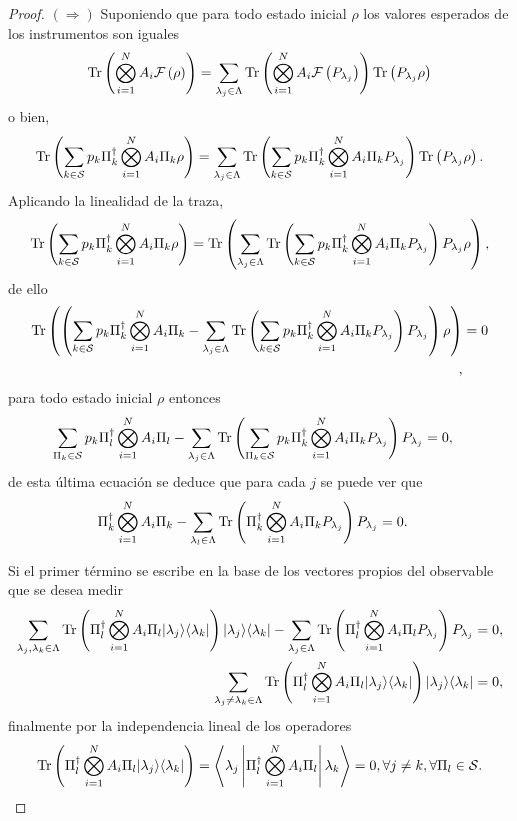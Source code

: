 \documentclass[12pt,oneside]{book}\raggedbottom{}
\begin{document}
\begin{proof}
    $(\Rightarrow)$ Suponiendo que para todo estado inicial $\rho$ los valores esperados de los instrumentos son iguales \[ {\rm Tr}\left( \bigotimes_{i=1}^{N} A_i \mathcal{F}\left(\rho\right)\right)=\sum_{\lambda_j\in \Lambda} {\rm Tr}\left(\bigotimes_{i=1}^{N} A_i\mathcal{F}\left(P_{\lambda_j}\right)\right) {\rm Tr}\left(P_{\lambda_j}\rho\right)\]
o bien, \[ {\rm Tr}\left( \sum_{k\in \mathcal{S}}p_k\Pi_{k}^{\dagger}\bigotimes_{i=1}^{N} A_i \Pi_{k}\rho\right)=\sum_{\lambda_j\in \Lambda} {\rm Tr}\left(\sum_{k\in \mathcal{S}}p_k\Pi_{k}^{\dagger}\bigotimes_{i=1}^{N} A_i\Pi_{k}P_{\lambda_j}\right) {\rm Tr}\left(P_{\lambda_j}\rho\right).\] Aplicando la linealidad de la traza, \[ {\rm Tr}\left( \sum_{k\in \mathcal{S}}p_k\Pi_{k}^{\dagger}\bigotimes_{i=1}^{N} A_i \Pi_{k}\rho\right)={\rm Tr}\left(\sum_{\lambda_j\in \Lambda} {\rm Tr}\left(\sum_{k\in \mathcal{S}}p_k\Pi_{k}^{\dagger}\bigotimes_{i=1}^{N} A_i\Pi_{k}P_{\lambda_j}\right) P_{\lambda_j}\rho\right),\]de ello  \[ \begin{split}{\rm Tr}\left( \left(\sum_{k\in \mathcal{S}}p_k\Pi_{k}^{\dagger}\bigotimes_{i=1}^{N} A_i \Pi_{k}-\sum_{\lambda_j\in \Lambda} {\rm Tr}\left(\sum_{k\in \mathcal{S}}p_k\Pi_{k}^{\dagger}\bigotimes_{i=1}^{N} A_i\Pi_{k}P_{\lambda_j}\right) P_{\lambda_j}\right)\rho\right)&=0\\,\end{split}\] para todo estado inicial $\rho$ entonces\[\begin{split}
    \sum_{\Pi_k\in \mathcal{S}}p_k\Pi_{l}^{\dagger}\bigotimes_{i=1}^{N} A_i \Pi_{l}-\sum_{\lambda_j\in \Lambda} {\rm Tr}\left(\sum_{\Pi_k\in \mathcal{S}}p_k\Pi_{k}^{\dagger}\bigotimes_{i=1}^{N} A_i\Pi_{k}P_{\lambda_j}\right) P_{\lambda_j}&=0, 
\end{split}\] de esta última ecuación se deduce que para cada $j$ se puede ver que \[\begin{split}
    \Pi_{k}^{\dagger}\bigotimes_{i=1}^{N} A_i \Pi_{k}-\sum_{\lambda_l\in \Lambda} {\rm Tr}\left(\Pi_{k}^{\dagger}\bigotimes_{i=1}^{N} A_i\Pi_{k}P_{\lambda_j}\right) P_{\lambda_j}&=0.
\end{split}\] 

Si el primer término se escribe en la base de los vectores propios del observable que se desea medir  \[\begin{split}
    \sum_{\lambda_j, \lambda_k\in \Lambda} {\rm Tr}\left(\Pi_{l}^{\dagger}\bigotimes_{i=1}^{N} A_i\Pi_{l}|\lambda_j\rangle \langle \lambda_k|\right) |\lambda_j\rangle \langle\lambda_k|-\sum_{\lambda_j\in \Lambda} {\rm Tr}\left(\Pi_{l}^{\dagger}\bigotimes_{i=1}^{N} A_i\Pi_{l}P_{\lambda_j}\right) P_{\lambda_j}&=0,\\
    \sum_{\lambda_j\neq\lambda_k\in \Lambda} {\rm Tr}\left(\Pi_{l}^{\dagger}\bigotimes_{i=1}^{N} A_i\Pi_{l}|\lambda_j\rangle \langle \lambda_k|\right) |\lambda_j\rangle \langle\lambda_k|&=0,
\end{split}\] finalmente por la independencia lineal de los operadores\[ {\rm Tr}\left(\Pi_{l}^{\dagger}\bigotimes_{i=1}^{N} A_i\Pi_{l}|\lambda_j\rangle \langle \lambda_k|\right)= \left\langle\lambda_j\left|\Pi_{l}^{\dagger}\bigotimes_{i=1}^{N} A_i\Pi_{l}\right|\lambda_k\right\rangle=0, \forall j\neq k, \forall \Pi_l \in \mathcal{S}.\]




\end{proof}
\end{document}

